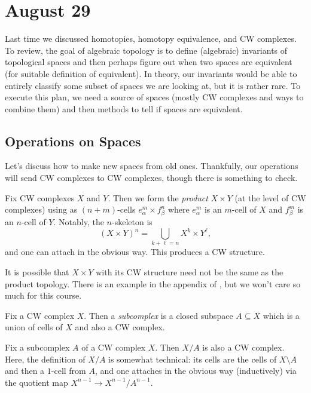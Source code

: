 \documentclass[../notes.tex]{subfiles}
\begin{document}
\section{August 29}

Last time we discussed homotopies, homotopy equivalence, and CW complexes. To review, the goal of algebraic topology is to define (algebraic) invariants of topological spaces and then perhaps figure out when two spaces are equivalent (for suitable definition of equivalent). In theory, our invariants would be able to entirely classify some subset of spaces we are looking at, but it is rather rare. To execute this plan, we need a source of spaces (mostly CW complexes and ways to combine them) and then methods to tell if spaces are equivalent.

\subsection{Operations on Spaces}
Let's discuss how to make new spaces from old ones. Thankfully, our operations will send CW complexes to CW complexes, though there is something to check.
\begin{definition}[product]
	Fix CW complexes $X$ and $Y$. Then we form the \textit{product} $X\times Y$ (at the level of CW complexes) using as $(n+m)$-cells $e^m_\alpha\times f^n_\beta$ where $e^m_\alpha$ is an $m$-cell of $X$ and $f^m_\beta$ is an $n$-cell of $Y$. Notably, the $n$-skeleton is
	\[(X\times Y)^n=\bigcup_{k+\ell=n}X^k\times Y^\ell,\]
	and one can attach in the obvious way. This produces a CW structure.
\end{definition}
\begin{remark}
	It is possible that $X\times Y$ with its CW structure need not be the same as the product topology. There is an example in the appendix of \cite{hatcher}, but we won't care so much for this course.
\end{remark}
\begin{definition}[subcomplex]
	Fix a CW complex $X$. Then a \textit{subcomplex} is a closed subspace $A\subseteq X$ which is a union of cells of $X$ and also a CW complex.
\end{definition}
\begin{definition}[quotient]
	Fix a subcomplex $A$ of a CW complex $X$. Then $X/A$ is also a CW complex. Here, the definition of $X/A$ is somewhat technical: its cells are the cells of $X\setminus A$ and then a $1$-cell from $A$, and one attaches in the obvious way (inductively) via the quotient map $X^{n-1}\to X^{n-1}/A^{n-1}$.
\end{definition}
\end{document}
